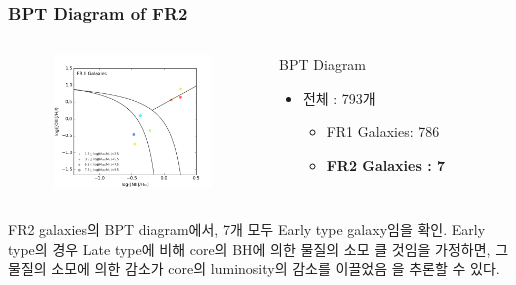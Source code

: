 \documentclass[xcolor={dvipsnames,table}]{beamer}
\newcommand\SM{\fontsize{8}{7.2}\selectfont}
\begin{document}
\begin{frame}
  \frametitle{BPT Diagram of FR2}
  \SM
  \begin{columns}
   \begin{figure}
    \centering
    \includegraphics[width=4.5cm, height=3.5cm]{BPT_FR2.png}
   \end{figure}
   \centering
   \begin{block}{BPT Diagram}
    \begin{itemize}
     \item 전체 : 793개
     \begin{itemize}
      \item FR1 Galaxies: 786
      \item \textbf{FR2 Galaxies : 7}
     \end{itemize}
    \end{itemize}
   \end{block}
  \end{columns}
  \vspace{0.2cm}
  FR2 galaxies의 BPT diagram에서, 7개 모두 Early type galaxy임을 확인.
Early type의 경우 Late type에 비해 core의 BH에 의한 물질의 소모 클 것임을
가정하면, 그 물질의 소모에 의한 감소가 core의 luminosity의 감소를 이끌었음
을 추론할 수 있다.
\end{frame}
\end{document}
